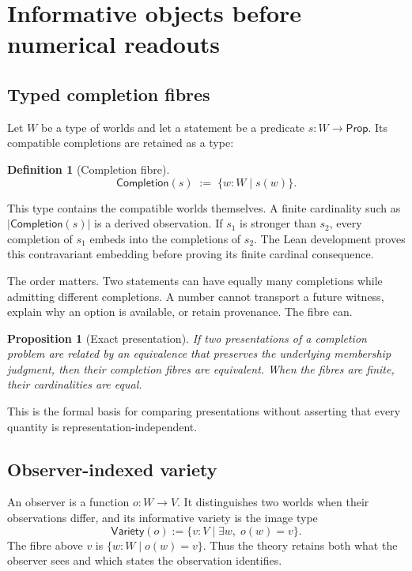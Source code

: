 \documentclass[11pt]{article}
\newtheorem{proposition}[theorem]{Proposition}
\newtheorem{definition}[theorem]{Definition}
\newcommand{\Comp}{\mathsf{Completion}}
\begin{document}
\section{Informative objects before numerical readouts}

\subsection{Typed completion fibres}

Let $W$ be a type of worlds and let a statement be a predicate $s : W \to
\mathsf{Prop}$.  Its compatible completions are retained as a type:

\begin{definition}[Completion fibre]
\[
  \Comp(s) \;:=\; \{w : W \mid s(w)\}.
\]
\end{definition}

This type contains the compatible worlds themselves.  A finite cardinality such as
$|\Comp(s)|$ is a derived observation.  If $s_1$ is stronger than $s_2$, every
completion of $s_1$ embeds into the completions of $s_2$.  The Lean development
proves this contravariant embedding before proving its finite cardinal consequence.

The order matters.  Two statements can have equally many completions while admitting
different completions.  A number cannot transport a future witness, explain why an
option is available, or retain provenance.  The fibre can.

\begin{proposition}[Exact presentation]
If two presentations of a completion problem are related by an equivalence that
preserves the underlying membership judgment, then their completion fibres are
equivalent.  When the fibres are finite, their cardinalities are equal.
\end{proposition}

This is the formal basis for comparing presentations without asserting that every
quantity is representation-independent.

\subsection{Observer-indexed variety}

An observer is a function $o : W \to V$.  It distinguishes two worlds when their
observations differ, and its informative variety is the image type
\[
  \mathsf{Variety}(o) := \{v : V \mid \exists w,\; o(w)=v\}.
\]
The fibre above $v$ is $\{w : W \mid o(w)=v\}$.  Thus the theory retains both what the
observer sees and which states the observation identifies.
\end{document}
